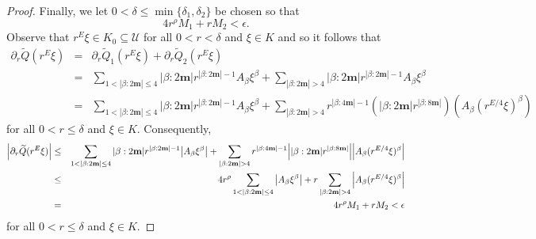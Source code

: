\documentclass[11pt]{article}
\theoremstyle{remark}
\begin{document}
\begin{proof}
Finally, we let $0<\delta\leq\min\{\delta_1,\delta_2\}$ be chosen so that
\begin{equation*}
    4r^\rho M_1+r M_2<\epsilon. 
\end{equation*}
Observe that $r^{E}\xi\in K_0\subseteq\mathcal{U}$ for all $0<r<\delta$ and $\xi\in K$ and so it follows that
\begin{eqnarray*}
    \partial_r\widetilde{Q}(r^E\xi)&=&\partial_r\widetilde{Q}_1(r^E\xi)+\partial_r\widetilde{Q}_2(r^E\xi)\\
    &=&\sum_{1<|\beta:2\mathbf{m}|\leq 4}|\beta:2\mathbf{m}|r^{|\beta:2\mathbf{m}|-1}A_\beta\xi^\beta+\sum_{|\beta:2\mathbf{m}|> 4}|\beta:2\mathbf{m}|r^{|\beta:2\mathbf{m}|-1}A_\beta\xi^\beta\\
    &=&\sum_{1<|\beta:2\mathbf{m}|\leq 4}|\beta:2\mathbf{m}|r^{|\beta:2\mathbf{m}|-1}A_\beta\xi^\beta+\sum_{|\beta:2\mathbf{m}|>4} r^{|\beta:4\mathbf{m}|-1}\left(|\beta:2\mathbf{m}|r^{|\beta:8\mathbf{m}|}\right)\left(A_\beta (r^{E/4}\xi)^\beta\right)
\end{eqnarray*}
for all $0<r\leq\delta$ and $\xi\in K$. Consequently,
\begin{eqnarray*}
    \abs{\partial_r\widetilde{Q}(r^E\xi)}&\leq & \sum_{1<|\beta:2\mathbf{m}|\leq 4}|\beta:2\mathbf{m}|r^{|\beta:2\mathbf{m}|-1}\abs{A_\beta\xi^\beta}+\sum_{|\beta:2\mathbf{m}|>4}r^{|\beta:4\mathbf{m}|-1}\abs{|\beta:2\mathbf{m}|r^{|\beta:8\mathbf{m}|}}\abs{A_\beta (r^{E/4}\xi)^\beta}\\
    &\leq&4 r^\rho \sum_{1<|\beta:2\mathbf{m}|\leq 4}\abs{A_\beta \xi^\beta}+r\sum_{|\beta:2\mathbf{m}|>4}\abs{A_\beta(r^{E/4}\xi)^\beta}\\
    &=&4 r^\rho M_1+rM_2<\epsilon
\end{eqnarray*}
for all $0<r\leq\delta$ and $\xi\in K$.

\end{proof}
\end{document}
